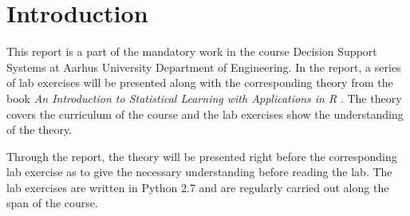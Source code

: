\chapter{Introduction}
\label{chp:intro}

This report is a part of the mandatory work in the course Decision Support Systems at Aarhus University Department of Engineering.
In the report, a series of lab exercises will be presented along with the corresponding theory from the book \emph{An Introduction to Statistical Learning with Applications in R} \cite{ISLR}. 
The theory covers the curriculum of the course and the lab exercises show the understanding of the theory. 

Through the report, the theory will be presented right before the corresponding lab exercise as to give the necessary understanding before reading the lab. The lab exercises are written in Python 2.7 and are regularly carried out along the span of the course. 